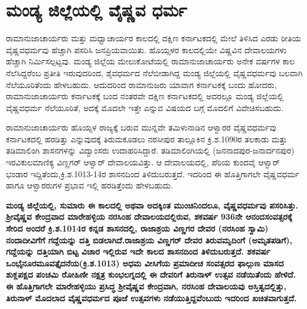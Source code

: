 \section*{ಮಂಡ್ಯ ಜಿಲ್ಲೆಯಲ್ಲಿ ವೈಷ್ಣವ ಧರ್ಮ}

ರಾಮಾನುಜಾಚಾರ್ಯರು ಮತ್ತು ಮಧ್ವಾಚಾರ್ಯರ ಕಾಲದಲ್ಲಿ ದಕ್ಷಿಣ ಕರ್ನಾಟಕದಲ್ಲಿ ಮೇಲೆ ತಿಳಿಸಿದ ಎರಡು ರೀತಿಯ ವೈಷ್ಣವಧರ್ಮವು ಹೆಚ್ಚಾಗಿ ಪಸರಿಸಿ ಜನಪ್ರಿಯವಾಯಿತು. ಹೊಯ್ಸಳರ ಕಾಲದಲ್ಲಿಯೇ ವಿಷ್ಣವಿನ ದೇವಾಲಯಗಳು ಹೆಚ್ಚಾಗಿ ನಿರ್ಮಿಸಲ್ಪಟ್ಟವು. ಮಂಡ್ಯ ಜಿಲ್ಲೆಯ ಮೇಲುಕೋಟೆಯಲ್ಲಿ ರಾಮಾನುಜಾಚಾರ್ಯರು ಅನೇಕ ವರ್ಷಗಳ ಕಾಲ ನೆಲೆಸಿದ್ದರೆಂಬ ಪ್ರತೀತಿ ಇರುವುದರಿಂದ, ಶೈವಧರ್ಮದ ನೆಲೆಬೀಡಾಗಿದ್ದ ಮಂಡ್ಯ ಜಿಲ್ಲೆಯಲ್ಲಿ ವೈಷ್ಣವಧರ್ಮವು ಬಲವಾಗಿ ನೆಲೆಯೂರಿತೆಂದು ಹೇಳಬಹುದು. ಆದುದರಿಂದ ರಾಮಾನುಜರು ಯಾವಾಗ ಕರ್ನಾಟಕಕ್ಕೆ ಬಂದು ಹೋದರು, ರಾಮಾನುಜಾಚಾರ್ಯರು ಕರ್ನಾಟಕಕ್ಕೆ ಬಂದ ನಂತರವೇ ದಕ್ಷಿಣ ಕರ್ನಾಟಕದಲ್ಲಿ ಅದರಲ್ಲೂ ಮಂಡ್ಯ ಜಿಲ್ಲೆಯಲ್ಲಿ ವೈಷ್ಣವಧರ್ಮ ನೆಲೆಯೂರಿತೆ, ಅದಕ್ಕೆ ಮೊದಲೇ ಇತ್ತೇ ಎನ್ನುವ ವಿಷಯದ ಬಗ್ಗೆ ಮೊದಲಿಗೆ ವಿವೇಚಿಸಬಹುದು.

ರಾಮಾನುಜಾಚಾರ್ಯರು ಹೊಯ್ಸಳ ರಾಜ್ಯಕ್ಕೆ ಬರುವ ಮುನ್ನವೇ ತಮಿಳುನಾಡಿನ ಆಳ್ವಾರರ ವೈಷ್ಣವಧರ್ಮವು ಕರ್ನಾಟಕದಲ್ಲಿ ಹರಡಿತ್ತು ಎನ್ನುವುದಕ್ಕೆ ತಿರುಮಕೂಡಲು ನರಸೀಪುರ ತಾಲ್ಲೂಕಿನ ಕ್ರಿ.ಶ.1090ರ ತಲಕಾಡು ಮತ್ತು ತಡಿಮಾಲಿಂಗಿ ಶಾಸನಗಳನ್ನು ವಿದ್ವಾಂಸರು ಉದಾಹರಿಸಿದ್ದಾರೆ. ತಡಿಮಾಲಿಂಗಿಯಲ್ಲಿ (ಜನನಾದಪುರ-ಜನಾರ್ದನಪುರ) ಇರವಿಕುಲಮಾಣಿಕ್ಯ ವಿಣ್ಣಗರ್​ ಆಳ್ವಾರ್​ ದೇವಾಲಯವಿತ್ತು. ಆ ದೇವಾಲಯದಲ್ಲಿ, ಪೆರಿಯ ಕುಂದವೈ ಆಳ್ವಾರ್​ ಭಂಡಾರ ಇದ್ದಿತೆಂದು,\break ಕ್ರಿ.ಶ.1013-14ರ ಶಾಸನದಿಂದ ತಿಳಿದುಬರುತ್ತದೆ. ಇದರಿಂದ ಈ ಹೊತ್ತಿಗಾಗಲೇ ವೈಷ್ಣವಧರ್ಮ ಹಾಗೂ ಆಳ್ವಾರರುಗಳ ಪ್ರಭಾವ ಇಲ್ಲಿ ಹರಡಿತ್ತೆಂದು ಹೇಳಬಹುದು.

\textbf{ಮಂಡ್ಯ ಜಿಲ್ಲೆಯಲ್ಲಿ, ಸುಮಾರು ಈ ಕಾಲದಲ್ಲಿ ಅಥವಾ ಅದಕ್ಕಿಂತ ಮುಂಚಿನಿಂದಲೂ, ವೈಷ್ಣವಧರ್ಮವು ಪಸರಿಸಿತ್ತು. ಶ‍್ರೀವೈಷ್ಣವ ಕೇಂದ್ರವಾದ ಮಾರೇಹಳ್ಳಿಯ ನರಸಿಂಹ ದೇವಾಲಯದಲ್ಲಿರುವ, ಶಕವರ್ಷ 936ನೇ ಆನಂದಸಂವತ್ಸರಕ್ಕೆ ಸೇರಿದ ಅಂದರೆ ಕ್ರಿ.ಶ.1014ರ ಕನ್ನಡ ಶಾಸನದಲ್ಲಿ, ರಾಜಾಶ್ರಯ ವಿಣ್ಣಗರ ದೇವರ (ನರಸಿಂಹ ಸ್ವಾಮಿ) ನಂದಾದೀವಿಗೆಗೆ ಗದ್ದೆಯನ್ನು ದತ್ತಿ ಬಿಡಲಾಗಿದೆ.ರಾಜಾಶ್ರಯ ವಿಣ್ಣಗರ್​ ದೇವರ ತಿರುವಮೃದಿಂಗೆ (ಅಮೃತಪಡಿಗೆ), ಗದ್ದೆಯನ್ನು ದತ್ತಿಯಾಗಿ ಬಿಟ್ಟ ವಿಚಾರ ಇಲ್ಲಿರುವ ಇದೇ ಕಾಲದ ಶಾಸನದಿಂದ ತಿಳಿದುಬರುತ್ತದೆ. ಶಕವರ್ಷ ಒಂಭೈನೂರಮೂವತ್ತೈದನೆಯ(ಕ್ರಿ.ಶ.1013) ಅಧಮ ವೀಸಿಗೆಯ ಪ್ರಮಾದೀಚ ಸಂವತ್ಸರದ ಫಾಲ್ಗುಣ ಮಾಸದ ಶುಕ್ಲಪಕ್ಷದ ಪಂಚಮಿ ರೋಹಿಣೀ ನಕ್ಷತ್ರ ಕುಂಭಲಗ್ನದಲ್ಲಿ ಈ ದೇವರಿಗೆ ತಿರುನಾಳ್​ ಉತ್ಸವ ನಡೆಯಿತೆಂದು ಹೇಳಿದೆ. ಈ ಹೊತ್ತಿಗಾಗಲೇ ಮಾರೇಹಳ್ಳಿಯು ಪ್ರಸಿದ್ಧ ಶ‍್ರೀವೈಷ್ಣವ ಕೇಂದ್ರವಾಗಿ, ನರಸಿಂಹ ದೇವಾಲಯವು ಅಸ್ತಿತ್ವದಲ್ಲಿತ್ತು, ತಿರುನಾಳ್​ ಮೊದಲಾದ ವೈಷ್ಣವಧರ್ಮದ ಪೂಜೆ ಉತ್ಸವಗಳು ನಡೆಯುತ್ತಿದ್ದವೆಂಬುದು ಇದರಿಂದ ಖಚಿತವಾಗುತ್ತದೆ.}

